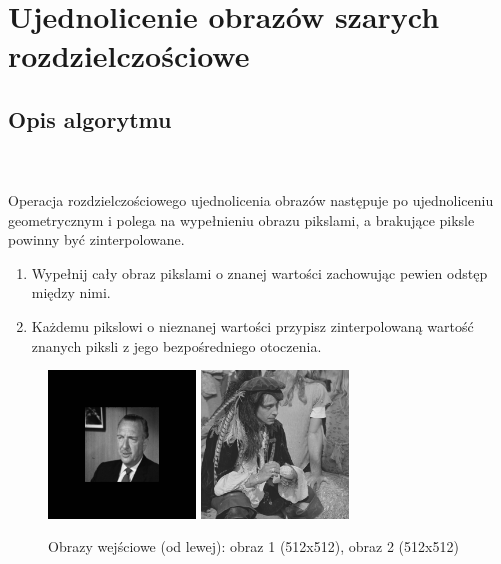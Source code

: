\documentclass[final,a4paper,openany,12pt]{mwbk}
\begin{document}
\section{Ujednolicenie obrazów szarych rozdzielczościowe}
\subsection*{Opis algorytmu}
\hfill
\\\\
\indent Operacja rozdzielczościowego ujednolicenia obrazów następuje po ujednoliceniu geometrycznym i polega na wypełnieniu obrazu pikslami, a brakujące piksle powinny być zinterpolowane.

\begin{enumerate}
	\item Wypełnij cały obraz pikslami o znanej wartości zachowując pewien odstęp między nimi.
	\item Każdemu pikslowi o nieznanej wartości przypisz zinterpolowaną wartość znanych piksli z jego bezpośredniego otoczenia.
\end{enumerate}

\begin{figure}[H]
	\begin{center}
		\includegraphics[width=0.35\textwidth]{gentelman_gray_unificationGeo_result}
		\includegraphics[width=0.35\textwidth]{pirate_gray_unificationGeo_result}
	\end{center}
	\caption{Obrazy wejściowe (od lewej): obraz 1 (512x512), obraz 2 (512x512)}
\end{figure}
\end{document}
